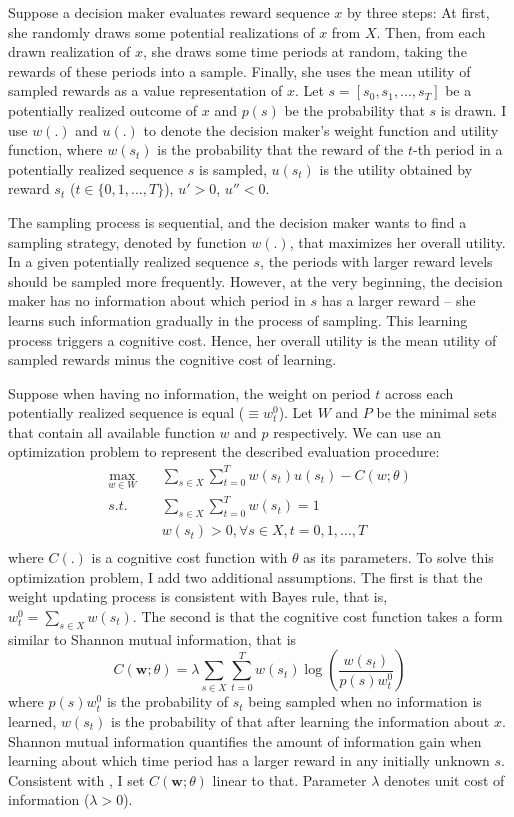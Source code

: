 \documentclass[
  12pt,
]{article}
\begin{document}
Suppose a decision maker evaluates reward sequence \(x\) by three steps:
At first, she randomly draws some potential realizations of \(x\) from
\(X\). Then, from each drawn realization of \(x\), she draws some time
periods at random, taking the rewards of these periods into a sample.
Finally, she uses the mean utility of sampled rewards as a value
representation of \(x\). Let \(s=[s_0,s_1,...,s_T]\) be a potentially
realized outcome of \(x\) and \(p(s)\) be the probability that \(s\) is
drawn. I use \(w(.)\) and \(u(.)\) to denote the decision maker's weight
function and utility function, where \(w(s_t)\) is the probability that
the reward of the \(t\)-th period in a potentially realized sequence
\(s\) is sampled, \(u(s_t)\) is the utility obtained by reward \(s_t\)
(\(t \in \{0,1,...,T\}\)), \(u'>0\), \(u''<0\).

The sampling process is sequential, and the decision maker wants to find
a sampling strategy, denoted by function \(w(.)\), that maximizes her
overall utility. In a given potentially realized sequence \(s\), the
periods with larger reward levels should be sampled more frequently.
However, at the very beginning, the decision maker has no information
about which period in \(s\) has a larger reward -- she learns such
information gradually in the process of sampling. This learning process
triggers a cognitive cost. Hence, her overall utility is the mean
utility of sampled rewards minus the cognitive cost of learning.

Suppose when having no information, the weight on period \(t\) across
each potentially realized sequence is equal (\(\equiv w^0_t\)). Let
\(W\) and \(P\) be the minimal sets that contain all available function
\(w\) and \(p\) respectively. We can use an optimization problem to
represent the described evaluation procedure: \[ 
\begin{aligned}
\max_{w\in W}  \quad & \sum_{s\in X}\sum_{t=0}^T w(s_t)u(s_t) - C(w;\theta) \\
s.t. \quad &  \sum_{s\in X}\sum_{t=0}^T w(s_t)=1 \\
& w(s_t)>0, \forall s\in X,t=0,1,…,T \\
\end{aligned}
\]where \(C(.)\) is a cognitive cost function with \(\theta\) as its
parameters. To solve this optimization problem, I add two additional
assumptions. The first is that the weight updating process is consistent
with Bayes rule, that is, \(w^0_t=\sum_{s\in X} w(s_t)\). The second is
that the cognitive cost function takes a form similar to Shannon mutual
information, that is\[
C(\textbf{w};\theta)= \lambda \sum_{s\in X}\sum_{t=0}^T w(s_t) \log\left(\frac{w(s_t)}{p(s)w_t^0}\right)
\]where \(p(s)w^0_t\) is the probability of \(s_t\) being sampled when
no information is learned, \(w(s_t)\) is the probability of that after
learning the information about \(x\). Shannon mutual information
quantifies the amount of information gain when learning about which time
period has a larger reward in any initially unknown \(s\). Consistent
with \citet{matejka_rational_2015}, I set \(C(\textbf{w};\theta)\)
linear to that. Parameter \(\lambda\) denotes unit cost of information
(\(\lambda>0\)).
\end{document}
